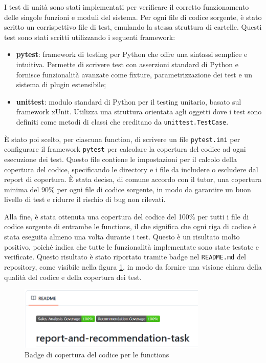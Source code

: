 I test di unità sono stati implementati per verificare il corretto funzionamento delle singole funzioni e moduli del sistema. Per ogni file di codice sorgente, è stato scritto un corrispettivo file di test, emulando la stessa struttura di cartelle. Questi test sono stati scritti utilizzando i seguenti framework:
\begin{itemize}
    \item \textbf{pytest}: framework di testing per Python che offre una sintassi semplice e intuitiva. Permette di scrivere test con asserzioni standard di Python e fornisce funzionalità avanzate come fixture, parametrizzazione dei test e un sistema di plugin estensibile;
    \item \textbf{unittest}: modulo standard di Python per il testing unitario, basato sul framework xUnit. Utilizza una struttura orientata agli oggetti dove i test sono definiti come metodi di classi che ereditano da \texttt{unittest.TestCase}.
\end{itemize}

È stato poi scelto, per ciascuna function, di scrivere un file \texttt{pytest.ini} per configurare il framework \texttt{pytest} per calcolare la copertura del codice ad ogni esecuzione dei test. Questo file contiene le impostazioni per il calcolo della copertura del codice, specificando le directory e i file da includere o escludere dal report di copertura. È stata decisa, di comune accordo con il tutor, una copertura minima del 90\% per ogni file di codice sorgente, in modo da garantire un buon livello di test e ridurre il rischio di bug non rilevati.

Alla fine, è stata ottenuta una copertura del codice del 100\% per tutti i file di codice sorgente di entrambe le functions, il che significa che ogni riga di codice è stata eseguita almeno una volta durante i test. Questo è un risultato molto positivo, poiché indica che tutte le funzionalità implementate sono state testate e verificate.
Questo risultato è stato riportato tramite badge nel \texttt{README.md} del repository, come visibile nella figura \ref{fig:coverage-badges}, in modo da fornire una visione chiara della qualità del codice e della copertura dei test.

\begin{figure}
    \centering
    \includegraphics[width=0.8\textwidth]{images/Badges di coverage delle functions.png}
    \caption{Badge di copertura del codice per le functions}
    \label{fig:coverage-badges}
\end{figure}


